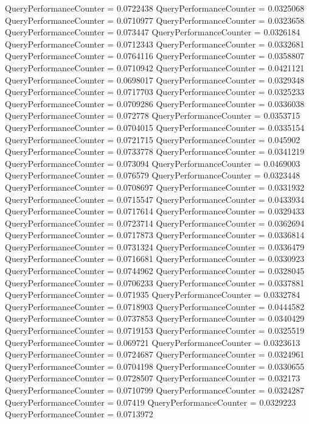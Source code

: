 \documentclass[9pt]{article}
\theoremstyle{plain}
\theoremstyle{definition}
\theoremstyle{remark}
\numberwithin{equation}{section}
\begin{document}
QueryPerformanceCounter  =  0.0722438
QueryPerformanceCounter  =  0.0325068
QueryPerformanceCounter  =  0.0710977
QueryPerformanceCounter  =  0.0323658
QueryPerformanceCounter  =  0.073447
QueryPerformanceCounter  =  0.0326184
QueryPerformanceCounter  =  0.0712343
QueryPerformanceCounter  =  0.0332681
QueryPerformanceCounter  =  0.0764116
QueryPerformanceCounter  =  0.0358807
QueryPerformanceCounter  =  0.0710942
QueryPerformanceCounter  =  0.0421121
QueryPerformanceCounter  =  0.0698017
QueryPerformanceCounter  =  0.0329348
QueryPerformanceCounter  =  0.0717703
QueryPerformanceCounter  =  0.0325233
QueryPerformanceCounter  =  0.0709286
QueryPerformanceCounter  =  0.0336038
QueryPerformanceCounter  =  0.072778
QueryPerformanceCounter  =  0.0353715
QueryPerformanceCounter  =  0.0704015
QueryPerformanceCounter  =  0.0335154
QueryPerformanceCounter  =  0.0721715
QueryPerformanceCounter  =  0.045902
QueryPerformanceCounter  =  0.0733778
QueryPerformanceCounter  =  0.0341219
QueryPerformanceCounter  =  0.073094
QueryPerformanceCounter  =  0.0469003
QueryPerformanceCounter  =  0.076579
QueryPerformanceCounter  =  0.0323448
QueryPerformanceCounter  =  0.0708697
QueryPerformanceCounter  =  0.0331932
QueryPerformanceCounter  =  0.0715547
QueryPerformanceCounter  =  0.0433934
QueryPerformanceCounter  =  0.0717614
QueryPerformanceCounter  =  0.0329433
QueryPerformanceCounter  =  0.0723714
QueryPerformanceCounter  =  0.0362694
QueryPerformanceCounter  =  0.0717873
QueryPerformanceCounter  =  0.0336814
QueryPerformanceCounter  =  0.0731324
QueryPerformanceCounter  =  0.0336479
QueryPerformanceCounter  =  0.0716681
QueryPerformanceCounter  =  0.0330923
QueryPerformanceCounter  =  0.0744962
QueryPerformanceCounter  =  0.0328045
QueryPerformanceCounter  =  0.0706233
QueryPerformanceCounter  =  0.0337881
QueryPerformanceCounter  =  0.071935
QueryPerformanceCounter  =  0.0332784
QueryPerformanceCounter  =  0.0718903
QueryPerformanceCounter  =  0.0444582
QueryPerformanceCounter  =  0.0737853
QueryPerformanceCounter  =  0.0340429
QueryPerformanceCounter  =  0.0719153
QueryPerformanceCounter  =  0.0325519
QueryPerformanceCounter  =  0.069721
QueryPerformanceCounter  =  0.0323613
QueryPerformanceCounter  =  0.0724687
QueryPerformanceCounter  =  0.0324961
QueryPerformanceCounter  =  0.0704198
QueryPerformanceCounter  =  0.0330655
QueryPerformanceCounter  =  0.0728507
QueryPerformanceCounter  =  0.032173
QueryPerformanceCounter  =  0.0710799
QueryPerformanceCounter  =  0.0324287
QueryPerformanceCounter  =  0.07419
QueryPerformanceCounter  =  0.0329223
QueryPerformanceCounter  =  0.0713972
\end{document}

